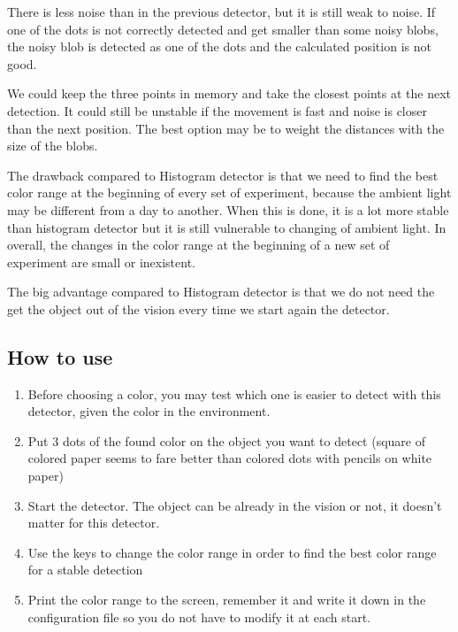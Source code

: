 There is less noise than in the previous detector, but it is still 
weak to noise. If one of the dots is not correctly detected and get 
smaller than some noisy blobs, the noisy blob is detected as one of 
the dots and the calculated position is not good.

We could keep the three points in memory and take the closest points 
at the next detection. It could still be unstable if the movement is 
fast and noise is closer than the next position. The best option may 
be to weight the distances with the size of the blobs. 

The drawback compared to Histogram detector is that we need to find 
the best color range at the beginning of every set of experiment, 
because the ambient light may be different from a day to another. When 
this is done, it is a lot more stable than histogram detector but it 
is still vulnerable to changing of ambient light. In overall, the changes 
in the color range at the beginning of a new set of experiment are 
small or inexistent.

The big advantage compared to Histogram detector is that we do not need 
the get the object out of the vision every time we start again the 
detector. 

\subsection{How to use}
    \begin{enumerate}
        \item Before choosing a color, you may test which one is easier 
        to detect with this detector, given the color in the environment.
        \item Put 3 dots of the found color on the object you want to 
        detect (square of colored paper seems to fare better than colored 
        dots with pencils on white paper)
        \item Start the detector. The object can be already in the vision 
        or not, it doesn’t matter for this detector. 
        \item Use the keys to change the color range in order to find the 
        best color range for a stable detection
        \item Print the color range to the screen, remember it and write 
        it down in the configuration file so you do not have to modify it 
        at each start.
    \end{enumerate}

